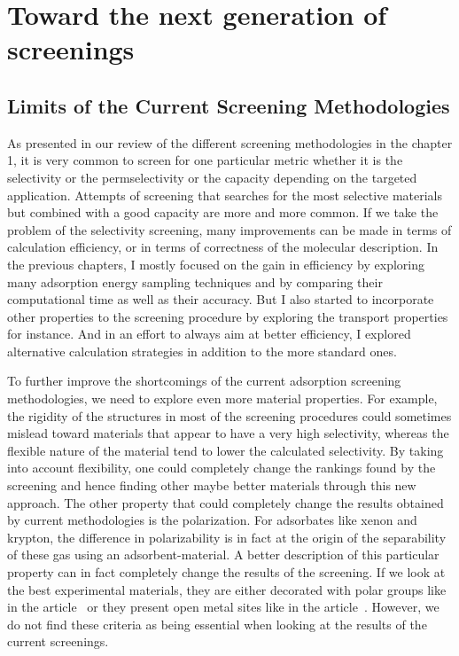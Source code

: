 \documentclass[main]{subfiles}
\begin{document}
\chapter{Toward the next generation of screenings}
\vspace*{-1\baselineskip}

\section{Limits of the Current Screening Methodologies}

As presented in our review of the different screening methodologies in the chapter 1, it is very common to screen for one particular metric whether it is the selectivity or the permselectivity or the capacity depending on the targeted application. Attempts of screening that searches for the most selective materials but combined with a good capacity are more and more common.\autocite{Chung_2019,Zhang_2022,Solanki_2020} If we take the problem of the selectivity screening, many improvements can be made in terms of calculation efficiency, or in terms of correctness of the molecular description. In the previous chapters, I mostly focused on the gain in efficiency by exploring many adsorption energy sampling techniques and by comparing their computational time as well as their accuracy. But I also started to incorporate other properties to the screening procedure by exploring the transport properties for instance. And in an effort to always aim at better efficiency, I explored alternative calculation strategies in addition to the more standard ones. 

To further improve the shortcomings of the current adsorption screening methodologies, we need to explore even more material properties. For example, the rigidity of the structures in most of the screening procedures could sometimes mislead toward materials that appear to have a very high selectivity, whereas the flexible nature of the material tend to lower the calculated selectivity. By taking into account flexibility, one could completely change the rankings found by the screening and hence finding other maybe better materials through this new approach. The other property that could completely change the results obtained by current methodologies is the polarization. For adsorbates like xenon and krypton, the difference in polarizability is in fact at the origin of the separability of these gas using an adsorbent-material. A better description of this particular property can in fact completely change the results of the screening. If we look at the best experimental materials, they are either decorated with polar groups like in the article~\cite{Li_2019} or they present open metal sites like in the article~\cite{Pei_2022}. However, we do not find these criteria as being essential when looking at the results of the current screenings. 
\end{document}
